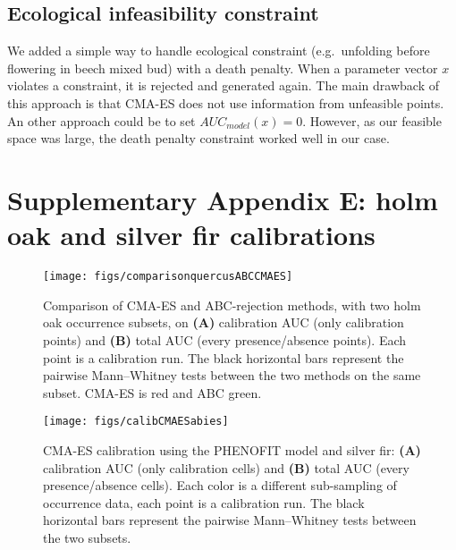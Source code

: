 \documentclass[11pt,]{article}
\begin{document}
\hypertarget{ecological-infeasibility-constraint}{%
\subsection{Ecological infeasibility
constraint}\label{ecological-infeasibility-constraint}}

We added a simple way to handle ecological constraint (e.g.~unfolding
before flowering in beech mixed bud) with a death penalty. When a
parameter vector \(x\) violates a constraint, it is rejected and
generated again. The main drawback of this approach is that CMA-ES does
not use information from unfeasible points. An other approach could be
to set \(AUC_{model}(x)=0\). However, as our feasible space was large,
the death penalty constraint worked well in our case.

\newpage

\hypertarget{appendixE}{%
\section{Supplementary Appendix E: holm oak and silver fir
calibrations}\label{appendixE}}

\renewcommand*\thetable{E.\arabic{table}}
\renewcommand*\thefigure{E.\arabic{figure}}

\setcounter{figure}{0}
\setcounter{table}{0}

\renewcommand*{\thepage}{E--\arabic{page}}

\hfill \break

\begin{figure}[H]

{\centering \texttt{[image: figs/comparisonquercusABCCMAES]} 

}

\caption{Comparison of CMA-ES and ABC-rejection methods, with two holm oak occurrence subsets, on \textbf{(A)} calibration AUC (only calibration points) and \textbf{(B)} total AUC (every presence/absence points). Each point is a calibration run. The black horizontal bars represent the pairwise Mann–Whitney tests between the two methods on the same subset. CMA-ES is red and ABC green.}\label{fig:comparisonquercusABCCMAES}
\end{figure}

\begin{figure}[H]

{\centering \texttt{[image: figs/calibCMAESabies]} 

}

\caption{CMA-ES calibration using the PHENOFIT model and silver fir: \textbf{(A)} calibration AUC (only calibration cells) and \textbf{(B)} total AUC (every presence/absence cells). Each color is a different sub-sampling of occurrence data, each point is a calibration run. The black horizontal bars represent the pairwise Mann–Whitney tests between the two subsets.}\label{fig:calibCMAESabies}
\end{figure}
\end{document}
